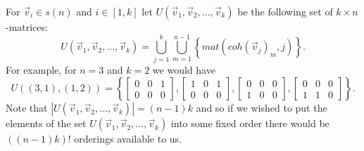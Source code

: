 \label{def:U}For $\vec v_i\in s(n)$ and $i \in [1,k]$  let $U(\vec v_1, \vec v_2, \ldots, \vec v_k)$ be the following set of $k\times n$-matrices:
$$ U(\vec v_1, \vec v_2, \ldots, \vec v_k)
=
\bigcup_{j=1}^k \bigcup_{m=1}^{n-1}\left\{ mat(coh(\vec v_j)_m, j) \right\}.
$$
For example, for $n=3$ and $k=2$ we would have
$$U((3,1), (1,2)) = \left\{
\begin{bmatrix}
0 & 0 & 1 \\
0 & 0 & 0
\end{bmatrix},
\begin{bmatrix}
1 & 0 & 1 \\
0 & 0 & 0
\end{bmatrix},
\begin{bmatrix}
0 & 0 & 0 \\
1 & 0 & 0
\end{bmatrix},
\begin{bmatrix}
0 & 0 & 0 \\
1 & 1 & 0 
\end{bmatrix}
\right\}
.$$
Note that $|U(\vec v_1, \vec v_2, \ldots, \vec v_k)|=(n-1)k$ and so if we wished to put the elements of the set $U(\vec v_1, \vec v_2, \ldots, \vec v_k)$ into some fixed order there would be $((n-1)k)!$ orderings available to us.

